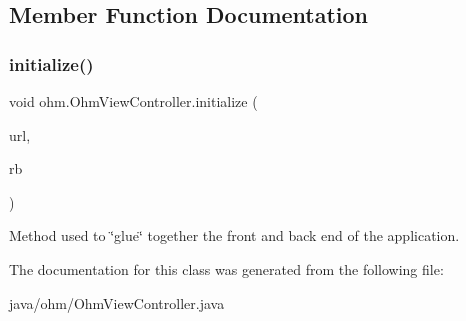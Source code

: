 \subsection{Member Function Documentation}
\hypertarget{classohm_1_1_ohm_view_controller_adea912cbe2b894ccf83999e44f466af0}{}\label{classohm_1_1_ohm_view_controller_adea912cbe2b894ccf83999e44f466af0} 
\subsubsection{\texorpdfstring{initialize()}{initialize()}}
{\footnotesize\ttfamily void ohm.\+Ohm\+View\+Controller.\+initialize (\begin{DoxyParamCaption}\item[{U\+RL}]{url,  }\item[{Resource\+Bundle}]{rb }\end{DoxyParamCaption})}

Method used to \char`\"{}glue\char`\"{} together the front and back end of the application. 

The documentation for this class was generated from the following file\+:\begin{DoxyCompactItemize}
\item 
java/ohm/Ohm\+View\+Controller.\+java\end{DoxyCompactItemize}
